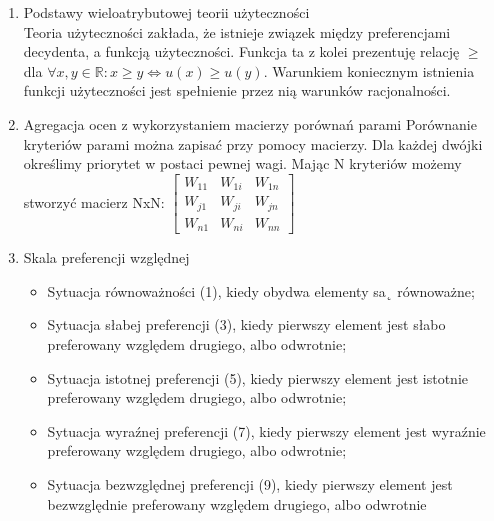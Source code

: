 \documentclass[11pt]{article}
\begin{document}
\begin{enumerate}
        \item Podstawy wieloatrybutowej teorii użyteczności\\
        Teoria użyteczności zakłada, że istnieje związek między preferencjami
        decydenta, a funkcją użyteczności. Funkcja ta z kolei prezentuję relację
        $\geq$ dla $\forall x, y \in \mathbb{R}: x \geq y \iff u(x) \geq u(y)$.
        Warunkiem koniecznym istnienia funkcji użyteczności jest spełnienie przez nią
        warunków racjonalności.
        
        \item Agregacja ocen z wykorzystaniem macierzy porównań parami
        Porównanie kryteriów parami można zapisać przy pomocy macierzy. Dla każdej dwójki określimy priorytet w postaci pewnej wagi. Mając N kryteriów możemy stworzyć macierz NxN:
        \begin{math}
        	\begin{bmatrix}
        		W_{11} & W_{1i} & W_{1n} \\
        		W_{j1} & W_{ji} & W_{jn} \\
        		W_{n1} & W_{ni} & W_{nn}
        	\end{bmatrix}
        \end{math}
        
        \item Skala preferencji względnej
        \begin{itemize}
        	\item Sytuacja równoważności (1), kiedy obydwa elementy sa˛ równoważne;
        	\item Sytuacja słabej preferencji (3), kiedy pierwszy element jest słabo
        	preferowany względem drugiego, albo odwrotnie;
        	\item Sytuacja istotnej preferencji (5), kiedy pierwszy element jest istotnie
        	preferowany względem drugiego, albo odwrotnie;
        	\item Sytuacja wyraźnej preferencji (7), kiedy pierwszy element jest wyraźnie
        	preferowany względem drugiego, albo odwrotnie;
        	\item Sytuacja bezwzględnej preferencji (9), kiedy pierwszy element jest
        	bezwzględnie preferowany względem drugiego, albo odwrotnie
        \end{itemize}
        

\end{enumerate}
\end{document}

